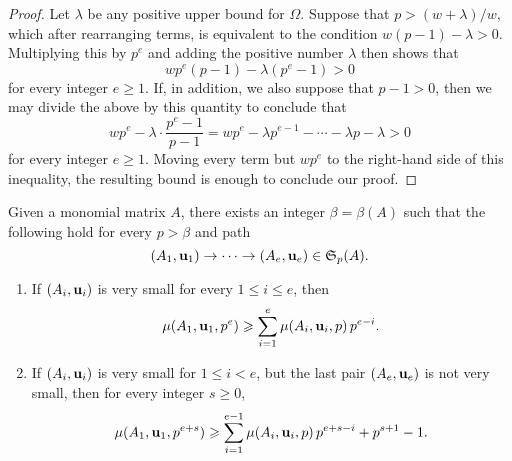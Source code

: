 \documentclass[11pt]{amsart}
\begin{document}
\begin{proof}
Let $\lambda$ be any positive upper bound for $\Omega$.  Suppose that $p > (w+\lambda)/w$, which after rearranging terms, is equivalent to the condition $w(p-1) - \lambda > 0$.  Multiplying this by $p^e$ and adding the positive number $\lambda$ then shows that
%
\[ wp^e ( p-1 ) - \lambda (p^e-1) > 0 \] for every integer $e \geq 1$.   If, in addition, we also suppose that $p -1 > 0$, then we may divide the above by this quantity to conclude that \[ w p^e - \lambda \cdot \frac{ p^e - 1}{p-1} = wp^e - \lambda p^{e-1} - \cdots - \lambda p - \lambda > 0 \] for every integer $e \geq 1$.   Moving every term but $wp^e$ to the right-hand side of this inequality, the resulting bound is enough to conclude our proof.
\end{proof}

%
%
\begin{corollary}\label{cor: iterated lifting}
Given a monomial matrix $A$, there exists an integer $\beta = \beta(A)$ such that the following hold for every $p > \beta$ and path \[ (A_1, \mathbf{u}_1) \to \cdots \to (A_e, \mathbf{u}_e)  \in \mathfrak{S}_p(A).\]
\begin{enumerate}
\item If $(A_i, \mathbf{u}_i)$ is very small for every $1 \leq i \leq e$, then \[ \mu(A_1, \mathbf{u}_1, p^e) \geqslant \sum_{i=1}^e \mu(A_i, \mathbf{u}_i, p) \, p^{e-i}.\]
\item If $(A_i, \mathbf{u}_i)$ is very small for $1 \leq i < e$, but the last pair $(A_e, \mathbf{u}_e)$ is not very small, then for every integer $s \geq 0$,
 \[ \mu(A_1, \mathbf{u}_1, p^{e+s}) \geqslant \sum_{i=1}^{e-1} \mu(A_i, \mathbf{u}_i, p) \, p^{e+s-i} + p^{s+1}-1. \]
\end{enumerate}
\end{corollary}
\end{document}
